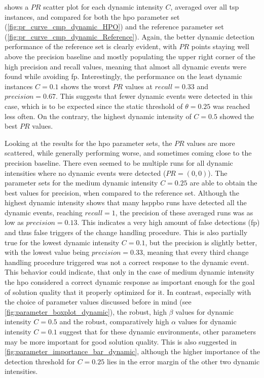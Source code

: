  shows a $PR$ scatter plot for each dynamic intensity $C$, averaged over all \gls{tsp} instances, and compared for both the \gls{hpo} parameter set (\ref{fig:pr_curve_cmp_dynamic_HPO}) and the reference parameter set (\ref{fig:pr_curve_cmp_dynamic_Reference}). Again, the better dynamic detection performance of the reference set is clearly evident, with $PR$ points staying well above the precision baseline and mostly populating the upper right corner of the high precision and recall values, meaning that almost all dynamic events were found while avoiding \glsdesc{fp}. Interestingly, the performance on the least dynamic instances $C=0.1$ shows the worst $PR$ values at $recall = 0.33$ and $precision = 0.67$. This suggests that fewer dynamic events were detected in this case, which is to be expected since the static threshold of $\theta =0.25$ was reached less often. On the contrary, the highest dynamic intensity of $C=0.5$ showed the best $PR$ values.

Looking at the results for the \gls{hpo} parameter sets, the $PR$ values are more scattered, while generally performing worse, and sometimes coming close to the precision baseline. There even seemed to be multiple runs for all dynamic intensities where no dynamic events were detected ($PR = (0,0)$). 
The parameter sets for the medium dynamic intensity $C=0.25$ are able to obtain the best values for precision, when compared to the reference set. Although the highest dynamic intensity shows that many \gls{hsppbo} runs have detected all the dynamic events, reaching $recall =1$, the precision of these averaged runs was as low as $precision=0.13$. This indicates a very high amount of false detections (\gls{fp}) and thus false triggers of the change handling procedure. This is also partially true for the lowest dynamic intensity $C=0.1$, but the precision is slightly better, with the lowest value being $precision=0.33$, meaning that every third change handling procedure triggered was not a correct response to the dynamic event. This behavior could indicate, that only in the case of medium dynamic intensity the \gls{hpo} considered a correct dynamic response as important enough for the goal of solution quality that it properly optimized for it. In contrast, especially with the choice of parameter values discussed before in mind (see \cref{fig:parameter_boxplot_dynamic}), the robust, high $\beta$ values for dynamic intensity $C=0.5$ and the robust, comparatively high $\alpha$ values for dynamic intensity $C=0.1$ suggest that for these dynamic environments, other parameters may be more important for good solution quality. This is also suggested in \cref{fig:parameter_importance_bar_dynamic}, although the higher importance of the detection threshold for $C=0.25$ lies in the error margin of the other two dynamic intensities.

